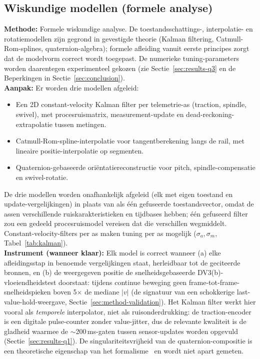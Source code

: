 \documentclass[10pt, a4paper, twocolumn]{article}
\begin{document}
\subsection{Wiskundige modellen (formele analyse)}
\label{sec:method-q3}
\textbf{Methode:} Formele wiskundige analyse. De toestandsschattings-,
interpolatie- en rotatiemodellen zijn gegrond in gevestigde theorie (Kalman
filtering, Catmull-Rom-splines, quaternion-algebra); formele afleiding vanuit
eerste principes zorgt dat de modelvorm correct wordt toegepast. De numerieke
tuning-parameters worden daarentegen experimenteel gekozen (zie
Sectie~\ref{sec:results-q3} en de Beperkingen in Sectie~\ref{sec:conclusion}).\\
\textbf{Aanpak:} Er worden drie modellen afgeleid:
\begin{itemize}[leftmargin=*]
  \item Een 2D constant-velocity Kalman filter per telemetrie-as (traction,
    spindle, swivel), met procesruismatrix, measurement-update en
    dead-reckoning-extrapolatie tussen metingen.
  \item Catmull-Rom-spline-interpolatie voor tangentberekening langs de rail, met
    lineaire positie-interpolatie op segmenten.
  \item Quaternion-gebaseerde oriëntatiereconstructie voor pitch, spindle-compensatie en swivel-rotatie.
\end{itemize}
De drie modellen worden onafhankelijk afgeleid (elk met eigen toestand en
update-vergelijkingen) in plaats van als één gefuseerde toestandsvector, omdat de
assen verschillende ruiskarakteristieken en tijdbases hebben; één gefuseerd filter
zou een gedeeld procesruismodel vereisen dat die verschillen wegmiddelt.
Constant-velocity-filters per as maken tuning per as mogelijk ($\sigma_a,
\sigma_m$, Tabel~\ref{tab:kalman}).\\
\textbf{Instrument (wanneer klaar):} Elk model is correct wanneer (a) elke
afleidingsstap in benoemde vergelijkingen staat, herleidbaar tot de geciteerde
bronnen, en (b) de weergegeven positie de snelheidsgebaseerde
DV3(b)-vloeiendheidstest doorstaat: tijdens continue beweging geen
frame-tot-frame-snelheidspieken boven 5$\times$ de mediane $|v|$ (de signatuur van
een schokkerige last-value-hold-weergave, Sectie~\ref{sec:method-validation}). Het Kalman
filter werkt hier vooral als \emph{temporele} interpolator, niet als
ruisonderdrukking: de traction-encoder is een digitale pulse-counter zonder
value-jitter, dus de relevante kwaliteit is de gladheid waarmee de
$\sim$200\,ms-gaten tussen sensor-updates worden opgevuld
(Sectie~\ref{sec:results-q1}). De singulariteitsvrijheid van de
quaternion-compositie is een theoretische eigenschap van het
formalisme~\cite{shoemake1985quaternion,kuipers1999quaternions} en wordt niet
apart gemeten.
\end{document}

